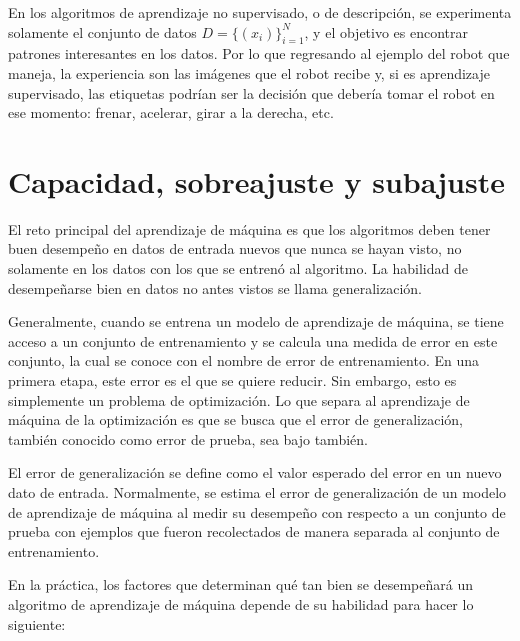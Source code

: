 \vspace{1em}

En los algoritmos de aprendizaje no supervisado, o de descripción, se experimenta solamente el conjunto de datos $D = \{(x_i)\}_{i=1}^N$, y el objetivo es encontrar patrones interesantes en los datos. Por lo que regresando al ejemplo del robot que maneja, la experiencia son las imágenes que el robot recibe y, si es aprendizaje supervisado, las etiquetas podrían ser la decisión que debería tomar el robot en ese momento: frenar, acelerar, girar a la derecha, etc. \cite{Murphy:2012:MLP:2380985}

\section{Capacidad, sobreajuste y subajuste}
El reto principal del aprendizaje de máquina es que los algoritmos deben tener buen desempeño en datos de entrada nuevos que nunca se hayan visto, no solamente en los datos con los que se entrenó al algoritmo. La habilidad de desempeñarse bien en datos no antes vistos se llama generalización.


\vspace{1em}

Generalmente, cuando se entrena un modelo de aprendizaje de máquina, se tiene acceso a un conjunto de entrenamiento y se calcula una medida de error en este conjunto, la cual se conoce con el nombre de error de entrenamiento. En una primera etapa, este error es el que se quiere reducir. Sin embargo, esto es simplemente un problema de optimización. Lo que separa al aprendizaje de máquina de la optimización es que se busca que el error de generalización, también conocido como error de prueba, sea bajo también. \cite{goodfellow-et-al-2016}

\vspace{1em}

El error de generalización se define como el valor esperado del error en un nuevo dato de entrada. Normalmente, se estima el error de generalización de un modelo de aprendizaje de máquina al medir su desempeño con respecto a un conjunto de prueba con ejemplos que fueron recolectados de manera separada al conjunto de entrenamiento. 

\vspace{1em}

En la práctica, los factores que determinan qué tan bien se desempeñará un algoritmo de aprendizaje de máquina depende de su habilidad para hacer lo siguiente:

